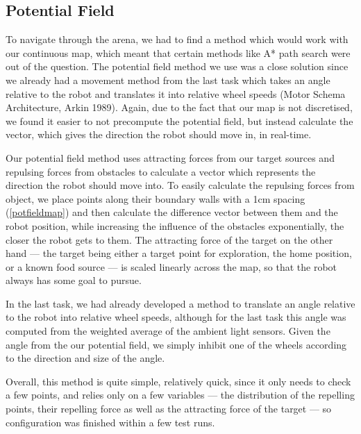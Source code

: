 \documentclass[paper=a4, fontsize=12pt]{scrartcl}	%
\numberwithin{equation}{section}		%
\numberwithin{figure}{section}			%
\numberwithin{table}{section}				%
\begin{document}
\subsection{Potential Field}
To navigate through the arena, we had to find a method which would work with our continuous map, which meant that certain methods like A* path search were out of the question. The potential field method we use was a close solution since we already had a movement method from the last task which takes an angle relative to the robot and translates it into relative wheel speeds (Motor Schema Architecture, Arkin 1989). Again, due to the fact that our map is not discretised, we found it easier to not precompute the potential field, but instead calculate the vector, which gives the direction the robot should move in, in real-time.

Our potential field method uses attracting forces from our target sources and repulsing forces from obstacles to calculate a vector which represents the direction the robot should move into. To easily calculate the repulsing forces from object, we place points along their boundary walls with a 1cm spacing (\ref{potfieldmap}) and then calculate the difference vector between them and the robot position, while increasing the influence of the obstacles exponentially, the closer the robot gets to them. The attracting force of the target on the other hand --- the target being either a target point for exploration, the home position, or a known food source --- is scaled linearly across the map, so that the robot always has some goal to pursue. 

In the last task, we had already developed a method to translate an angle relative to the robot into relative wheel speeds, although for the last task this angle was computed from the weighted average of the ambient light sensors. Given the angle from the our potential field, we simply inhibit one of the wheels according to the direction and size of the angle.

Overall, this method is quite simple, relatively quick, since it only needs to check a few points, and relies only on a few variables --- the distribution of the repelling points, their repelling force as well as the attracting force of the target --- so configuration was finished within a few test runs.
\end{document}
